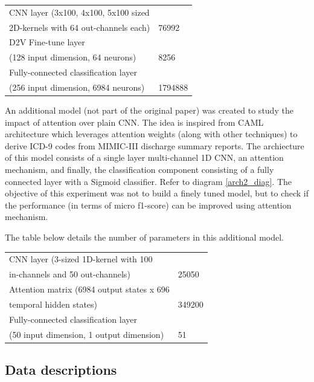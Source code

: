 \documentclass[11pt,a4paper]{article}
\begin{document}
\begin{small}
\begin{tabular}{ ll }
  \hline
  	CNN layer (3x100, 4x100, 5x100 sized \\ 2D-kernels with 64 out-channels each) & 76992 \\
  \hline
  	D2V Fine-tune layer \\ (128 input dimension, 64 neurons) & 8256 \\
  \hline
  	Fully-connected classification layer \\ (256 input dimension, 6984 neurons) & 1794888 \\
  \hline
\end{tabular}
\end{small}
\newline

An additional model (not part of the original paper) was created to study the impact of attention over plain CNN. The idea is inspired from CAML\citep{mullenbach-etal-2018-explainable} architecture which leverages attention weights (along with other techniques) to derive ICD-9 codes from MIMIC-III discharge summary reports. The archiecture of this model consists of a single layer multi-channel 1D CNN, an attention mechanism, and finally, the classification component consisting of a fully connected layer with a Sigmoid classifier. Refer to diagram \ref{arch2_diag}. The objective of this experiment was not to build a finely tuned model, but to check if the performance (in terms of micro f1-score) can be improved using attention mechanism.

The table below details the number of parameters in this additional model.
\newline

\begin{small}
\begin{tabular}{ ll }
  \hline
  	CNN layer (3-sized 1D-kernel with 100 \\ in-channels and 50 out-channels) & 25050 \\
  \hline
  	Attention matrix (6984 output states x 696 \\ temporal hidden states) & 349200 \\
  \hline
  	Fully-connected classification layer \\(50 input dimension, 1 output dimension) & 51 \\
  \hline
\end{tabular}
\end{small}


\subsection{Data descriptions}
\end{document}
